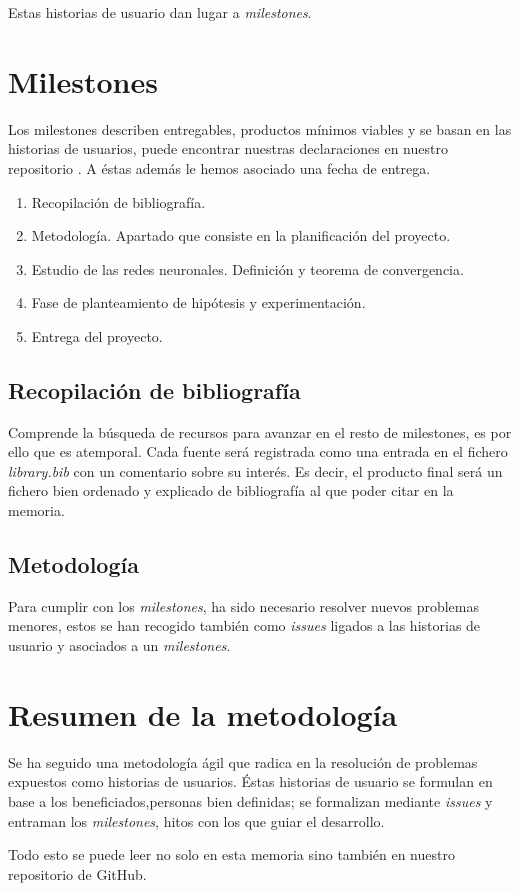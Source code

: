 
Estas historias de usuario dan lugar a \textit{milestones}. 

\section{Milestones}  

Los milestones describen entregables, productos mínimos viables y se basan en las historias de usuarios,
puede encontrar nuestras declaraciones en nuestro repositorio \cite{TFG-Estudio-de-las-redes-neuronales-milestones}. 
A éstas además le hemos asociado una fecha de entrega. 

\begin{enumerate}
    \item Recopilación de bibliografía. 
    \item Metodología. Apartado que consiste en la planificación del proyecto. 
    \item Estudio de las redes neuronales. Definición y teorema de convergencia. 
    \item Fase de planteamiento de hipótesis y experimentación. 
    \item Entrega del proyecto.
\end{enumerate}  

\subsection{Recopilación de bibliografía}
Comprende la búsqueda de recursos para avanzar en el resto de milestones, es por ello que es atemporal. 
Cada fuente será registrada como una entrada en el fichero \textit{library.bib} con un comentario sobre su 
interés. Es decir, el producto final será un fichero bien ordenado y explicado de bibliografía al que poder 
citar en la memoria.

\subsection{Metodología}




Para cumplir con los \textit{milestones},  ha sido necesario resolver nuevos  problemas menores, estos se han
recogido también como \textit{issues} ligados a las historias de usuario y asociados a un  \textit{milestones}.

\section{Resumen de la metodología}  

Se ha seguido una metodología ágil que radica en la resolución de problemas expuestos como historias de usuarios. 
Éstas historias de usuario se formulan en base a los beneficiados,personas bien definidas; se formalizan 
mediante \textit{issues} y entraman los \textit{milestones}, hitos con los que guiar el desarrollo.

Todo esto se puede leer no solo en esta memoria sino también en nuestro repositorio de GitHub. 
 




